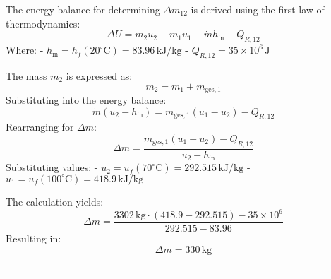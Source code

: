 The energy balance for determining \( \Delta m_{12} \) is derived using the first law of thermodynamics:  
\[
\Delta U = m_2 u_2 - m_1 u_1 - \dot{m} h_{\text{in}} - Q_{R,12}
\]  
Where:  
- \( h_{\text{in}} = h_f(20^\circ\text{C}) = 83.96 \, \text{kJ/kg} \)  
- \( Q_{R,12} = 35 \times 10^6 \, \text{J} \)  

The mass \( m_2 \) is expressed as:  
\[
m_2 = m_1 + m_{\text{ges},1}
\]  
Substituting into the energy balance:  
\[
\dot{m} (u_2 - h_{\text{in}}) = m_{\text{ges},1} (u_1 - u_2) - Q_{R,12}
\]  
Rearranging for \( \Delta m \):  
\[
\Delta m = \frac{m_{\text{ges},1} (u_1 - u_2) - Q_{R,12}}{u_2 - h_{\text{in}}}
\]  
Substituting values:  
- \( u_2 = u_f(70^\circ\text{C}) = 292.515 \, \text{kJ/kg} \)  
- \( u_1 = u_f(100^\circ\text{C}) = 418.9 \, \text{kJ/kg} \)  

The calculation yields:  
\[
\Delta m = \frac{3302 \, \text{kg} \cdot (418.9 - 292.515) - 35 \times 10^6}{292.515 - 83.96}
\]  
Resulting in:  
\[
\Delta m = 330 \, \text{kg}
\]  

---